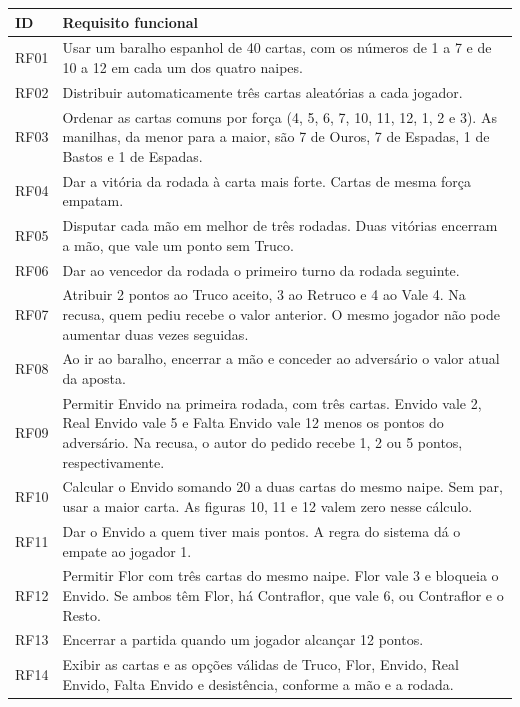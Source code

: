 \documentclass[11pt,a4paper]{article}
\begin{document}
\begin{longtable}{>{\raggedright\arraybackslash}p{}>{\raggedright\arraybackslash}p{}}
\toprule
\rowcolor{cabecalho}\textbf{ID} & \textbf{Requisito funcional} \\
\midrule
\endhead
RF01 & Usar um baralho espanhol de 40 cartas, com os números de 1 a 7 e de 10 a 12 em cada um dos quatro naipes. \\
RF02 & Distribuir automaticamente três cartas aleatórias a cada jogador. \\
RF03 & Ordenar as cartas comuns por força (4, 5, 6, 7, 10, 11, 12, 1, 2 e 3). As manilhas, da menor para a maior, são 7 de Ouros, 7 de Espadas, 1 de Bastos e 1 de Espadas. \\
RF04 & Dar a vitória da rodada à carta mais forte. Cartas de mesma força empatam. \\
RF05 & Disputar cada mão em melhor de três rodadas. Duas vitórias encerram a mão, que vale um ponto sem Truco. \\
RF06 & Dar ao vencedor da rodada o primeiro turno da rodada seguinte. \\
RF07 & Atribuir 2 pontos ao Truco aceito, 3 ao Retruco e 4 ao Vale 4. Na recusa, quem pediu recebe o valor anterior. O mesmo jogador não pode aumentar duas vezes seguidas. \\
RF08 & Ao ir ao baralho, encerrar a mão e conceder ao adversário o valor atual da aposta. \\
RF09 & Permitir Envido na primeira rodada, com três cartas. Envido vale 2, Real Envido vale 5 e Falta Envido vale 12 menos os pontos do adversário. Na recusa, o autor do pedido recebe 1, 2 ou 5 pontos, respectivamente. \\
RF10 & Calcular o Envido somando 20 a duas cartas do mesmo naipe. Sem par, usar a maior carta. As figuras 10, 11 e 12 valem zero nesse cálculo. \\
RF11 & Dar o Envido a quem tiver mais pontos. A regra do sistema dá o empate ao jogador 1. \\
RF12 & Permitir Flor com três cartas do mesmo naipe. Flor vale 3 e bloqueia o Envido. Se ambos têm Flor, há Contraflor, que vale 6, ou Contraflor e o Resto. \\
RF13 & Encerrar a partida quando um jogador alcançar 12 pontos. \\
RF14 & Exibir as cartas e as opções válidas de Truco, Flor, Envido, Real Envido, Falta Envido e desistência, conforme a mão e a rodada. \\

\end{longtable}
\end{document}
